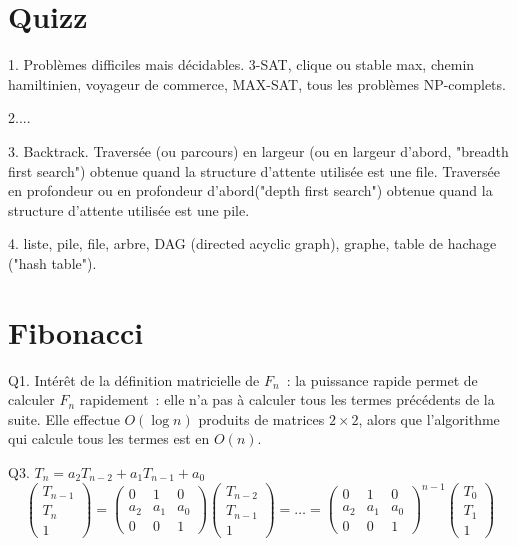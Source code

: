 \documentclass[11pt]{article}
\begin{document}
\section{Quizz}

1. Problèmes difficiles mais décidables. 3-SAT, clique ou stable max, chemin hamiltinien, voyageur de commerce, MAX-SAT, tous les problèmes NP-complets.

2....

3. Backtrack. Traversée (ou parcours) en largeur (ou en largeur d'abord, "breadth first search") obtenue quand la structure d'attente utilisée est une file. Traversée en profondeur ou en profondeur d'abord("depth first search") obtenue quand la structure d'attente utilisée est une pile.

4. liste, pile, file, arbre, DAG (directed acyclic graph), graphe, table de hachage ("hash table").

\section{Fibonacci}

Q1. Intérêt de la définition matricielle de $F_n$~: la puissance rapide permet de calculer $F_n$ rapidement~:  elle n'a pas à calculer tous les termes précédents de la suite.
Elle effectue $O(\log n)$ produits de matrices $2\times 2$, alors que l'algorithme qui calcule tous les termes est en $O(n)$.

Q3. $T_n = a_{2}T_{n-2} + a_1T_{n-1}+ a_0$
$$\left(\begin{array}{c} T_{n-1}  \\
T_{n}\\
1 \end{array}\right)=
\left(\begin{array}{ccc} 
0 & 1 & 0 \\
a_2 & a_1 & a_0 \\
0 & 0 & 1 \end{array}\right)\left(\begin{array}{c} T_{n-2}  \\
 T_{n-1} \\
1 \end{array}\right) 
=\ldots = \left(\begin{array}{ccc}
0 & 1 & 0 \\
a_2 & a_1 & a_0 \\
0 & 0 & 1 \end{array}\right)^{n-1}\left(\begin{array}{c} T_{0} \\
T_1 \\
1  \end{array}\right)
$$
\end{document}
